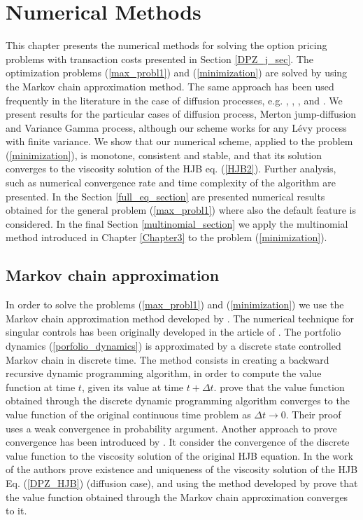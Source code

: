 

\chapter{Numerical Methods}\label{Chapter6}
\minitoc%

\vspace{5em}


This chapter presents the numerical methods for solving the option pricing problems with transaction costs presented in Section \ref{DPZ_j_sec}.
The optimization problems (\ref{max_probl1}) and (\ref{minimization}) are solved by using the Markov chain approximation method. The same approach has been used 
frequently in the literature in the case of diffusion processes, e.g. \cite{HoNe89}, \cite{DaPaZa93}, \cite{Damgaard}, \cite{Mon04} and \cite{Pal15}. 
We present results for the particular cases of diffusion process, Merton jump-diffusion and Variance Gamma process, although our scheme works for any Lévy process with finite variance. 
We show that our numerical scheme, applied to the problem (\ref{minimization}), is monotone, consistent and stable, and that its solution converges to the viscosity solution of the  
HJB eq. (\ref{HJB2}).
Further analysis, such as numerical convergence rate and time complexity of the algorithm are presented.
In the Section \ref{full_eq_section} are presented numerical results obtained for the general problem (\ref{max_probl1}) where also the default feature is considered.
In the final Section \ref{multinomial_section} we apply the multinomial method introduced in Chapter \ref{Chapter3} to the problem (\ref{minimization}).




\section{Markov chain approximation} \label{MC_section}

In order to solve the problems (\ref{max_probl1}) and (\ref{minimization}) we use the Markov chain approximation method developed by \cite{Kushner}.
The numerical technique for singular controls has been originally developed in the article of \cite{MaKu91}.
The portfolio dynamics (\ref{porfolio_dynamics}) is approximated by a discrete state controlled Markov chain in discrete time. 
The method consists in creating a backward recursive 
dynamic programming algorithm, in order to compute the value function at time $t$, given its value at time $t+\Delta t$.
\cite{Kushner} prove that the value function obtained through the discrete dynamic programming algorithm converges to 
the value function of the original continuous time problem as $\Delta t \to 0$. 
Their proof uses a weak convergence in probability argument.
Another approach to prove convergence has been introduced by \cite{BaSo91}. It consider the convergence of the discrete value function to the viscosity solution of the 
original HJB equation.
In the work of \cite{DaPaZa93} the authors prove existence and uniqueness of the viscosity solution
of the HJB Eq. (\ref{DPZ_HJB}) (diffusion case), and using the method developed by \cite{BaSo91} prove 
that the value function obtained through the Markov chain approximation converges to it.

